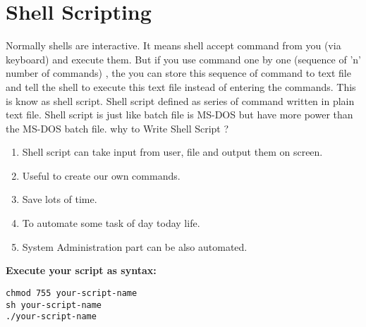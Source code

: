 \section{Shell Scripting}
Normally shells are interactive. It means shell accept command from you (via keyboard) and execute them. But if you use command one by one (sequence of 'n' number of commands) , the you can store this sequence of command to text file and tell the shell to execute this text file instead of entering the commands. This is know as shell script.
Shell script defined as series of command written in plain text file. Shell script is just like batch file is MS-DOS but have more power than the MS-DOS batch file.
why to Write Shell Script ?
\begin{enumerate} 
\item Shell script can take input from user, file and output them on screen.
\item Useful to create our own commands.
\item Save lots of time.
\item To automate some task of day today life.
\item System Administration part can be also automated.
\end{enumerate} 
{ \bf Execute your script as syntax:}
\begin{verbatim}
chmod 755 your-script-name
sh your-script-name
./your-script-name
\end{verbatim}
